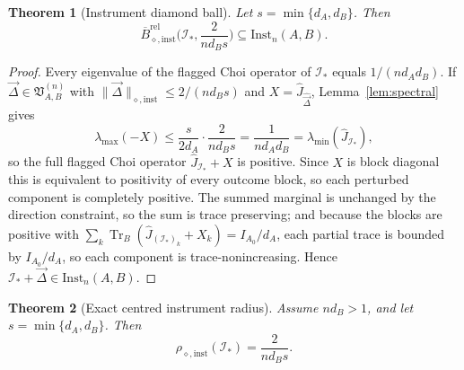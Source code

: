 \documentclass[11pt,a4paper]{article}
\newtheorem{theorem}{Theorem}[section]
\newcommand{\Inst}{\mathrm{Inst}}
\newcommand{\Tr}{\operatorname{Tr}}
\newcommand{\Jhat}{\widehat J}
\newcommand{\vD}{\vec{\Delta}}
\begin{document}
\begin{theorem}[Instrument diamond ball]
\label{thm:ball}
Let $s=\min\{d_A,d_B\}$. Then
\[
\overline B_{\diamond,\mathrm{inst}}^{\mathrm{rel}}\Big(\mathcal I_*,\frac{2}{nd_Bs}\Big)
\subseteq\Inst_n(A,B).
\]
\end{theorem}

\begin{proof}
Every eigenvalue of the flagged Choi operator of $\mathcal I_*$ equals $1/(nd_Ad_B)$. If $\vD\in\mathfrak V_{A,B}^{(n)}$ with $\|\vD\|_{\diamond,\mathrm{inst}}\le2/(nd_Bs)$ and $X=\Jhat_{\widehat{\vD}}$, Lemma~\ref{lem:spectral} gives
\[
\lambda_{\max}(-X)\le\frac{s}{2d_A}\cdot\frac{2}{nd_Bs}=\frac1{nd_Ad_B}=\lambda_{\min}(\Jhat_{\mathcal I_*}),
\]
so the full flagged Choi operator $\Jhat_{\mathcal I_*}+X$ is positive. Since $X$ is block diagonal this is equivalent to positivity of every outcome block, so each perturbed component is completely positive. The summed marginal is unchanged by the direction constraint, so the sum is trace preserving; and because the blocks are positive with $\sum_k\Tr_B(\Jhat_{(\mathcal I_*)_k}+X_k)=I_{A_0}/d_A$, each partial trace is bounded by $I_{A_0}/d_A$, so each component is trace-nonincreasing. Hence $\mathcal I_*+\vD\in\Inst_n(A,B)$.
\end{proof}

\begin{theorem}[Exact centred instrument radius]
\label{thm:exact-radius}
Assume $nd_B>1$, and let $s=\min\{d_A,d_B\}$. Then
\[
\rho_{\diamond,\mathrm{inst}}(\mathcal I_*)=\frac{2}{nd_Bs}.
\]
\end{theorem}
\end{document}
